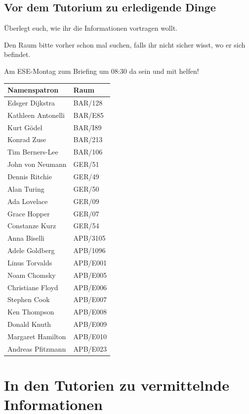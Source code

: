 \documentclass[a4paper,12pt]{report}
\begin{document}
\section{Vor dem Tutorium zu erledigende Dinge}
\begin{itemize*}
\item Überlegt euch, wie ihr die Informationen vortragen wollt.
\item Den Raum bitte vorher schon mal suchen, falls ihr nicht sicher wisst, wo er sich befindet.
\item Am ESE-Montag zum Briefing um 08:30 da sein und mit helfen!
\end{itemize*}
\label{tabelle}
\begin{center}
\vspace{1cm}
\begin{tabular}[h]{|l|l|}
	\hline
	\textbf{Namenspatron}		& \textbf{Raum}\\ \hline
	Edsger Dijkstra				& BAR/128\\
	Kathleen Antonelli			& BAR/E85\\
	Kurt Gödel					& BAR/I89\\
	Konrad Zuse					& BAR/213\\
	Tim Berners-Lee				& BAR/106\\
	John von Neumann			& GER/51\\
	Dennis Ritchie				& GER/49\\
	Alan Turing 				& GER/50\\
	Ada Lovelace				& GER/09\\
	Grace Hopper				& GER/07\\
	Constanze Kurz				& GER/54\\
	Anna Biselli				& APB/3105\\
	Adele Goldberg				& APB/1096\\
	Linus Torvalds				& APB/E001\\
	Noam Chomsky				& APB/E005\\
	Christiane Floyd			& APB/E006\\
	Stephen Cook				& APB/E007\\
	Ken Thompson				& APB/E008\\
	Donald Knuth				& APB/E009\\
	Margaret Hamilton			& APB/E010\\
	Andreas Pfitzmann			& APB/E023\\
	\hline
\end{tabular}
\end{center}

\chapter{In den Tutorien zu vermittelnde Informationen}
\end{document}
